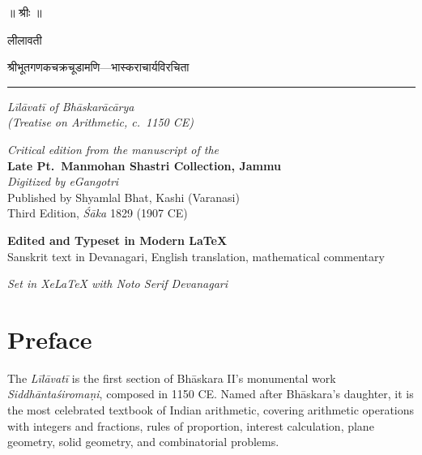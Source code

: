 \documentclass[10pt,a4paper]{article}
\newcommand{\shortline}{\noindent\rule{0.5\textwidth}{0.4pt}\par}
\begin{document}
\begin{titlepage}
\centering
\vspace*{0.5cm}

{\Huge\devanagarifont\textcolor{titlecolor}{॥ श्रीः ॥}}
\vspace{0.4cm}

{\fontsize{28}{34}\selectfont\devanagarifont\textcolor{titlecolor}{लीलावती}}
\vspace{0.2cm}

{\large\devanagarifont\textcolor{sectioncolor}{श्रीभूतगणकचक्रचूडामणि—भास्कराचार्यविरचिता}}
\vspace{0.15cm}

\shortline
\vspace{0.1cm}

{\large\textit{Līlāvatī of Bhāskarācārya}}\\
{\small\textit{(Treatise on Arithmetic, c.\ 1150 CE)}}
\vspace{0.3cm}

\begin{minipage}{0.82\textwidth}
\centering\small
\textit{Critical edition from the manuscript of the}\\
\textbf{Late Pt.\ Manmohan Shastri Collection, Jammu}\\
\textit{Digitized by eGangotri}\\[0.1em]
Published by Shyamlal Bhat, Kashi (Varanasi)\\
Third Edition, \textit{Śāka} 1829 (1907 CE)
\end{minipage}
\vspace{0.4cm}

{\normalsize\textbf{Edited and Typeset in Modern LaTeX}}\\[0.1em]
{\small Sanskrit text in Devanagari, English translation, mathematical commentary}

\vfill

{\footnotesize\textit{Set in XeLaTeX with Noto Serif Devanagari}}
\end{titlepage}

\pagestyle{plain}

\section*{Preface}

The \textit{Līlāvatī} is the first section of Bhāskara II's monumental work \textit{Siddhāntaśiromaṇi}, composed in 1150 CE. Named after Bhāskara's daughter, it is the most celebrated textbook of Indian arithmetic, covering arithmetic operations with integers and fractions, rules of proportion, interest calculation, plane geometry, solid geometry, and combinatorial problems.
\end{document}
